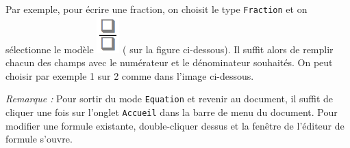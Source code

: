 



Par exemple, pour écrire une fraction, on choisit le type \texttt{Fraction} et on sélectionne le modèle \includegraphics[width=.6cm]{./images/texte03/Texte03_Formule7} ( sur la figure ci-dessous). Il suffit alors de remplir chacun des champs avec le numérateur et le dénominateur souhaités. On peut choisir par exemple 1 sur 2 comme dans l'image ci-dessous.




\emph{Remarque :} Pour sortir du mode \texttt{Equation} et revenir au document, il suffit de cliquer une fois sur l'onglet \texttt{Accueil} dans la barre de menu du document. Pour modifier une formule existante, double-cliquer dessus et la fenêtre de l'éditeur de formule s'ouvre.

